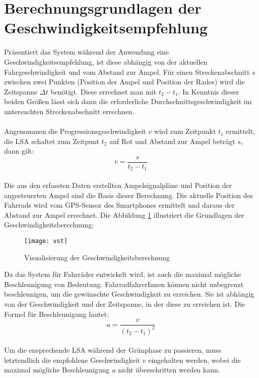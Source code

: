 \section{\label{sec:mathGrundlagen}Berechnungsgrundlagen der Geschwindigkeitsempfehlung}
Präsentiert das System während der Anwendung eine Geschwindigkeitsempfehlung, ist diese abhängig von der aktuellen Fahrgeschwindigkeit und vom Abstand zur Ampel. Für einen Streckenabschnitt $s$ zwischen zwei Punkten (Position der Ampel und Position der Rades) wird die Zeitspanne $\Delta t$ benötigt. Diese errechnet man mit $t_{2} - t_{1}$. In Kenntnis dieser beiden Größen lässt sich dann die erforderliche Durchschnittsgeschwindigkeit im untersuchten Streckenabschnitt errechnen.\\\\ 
Angenommen die Progressionsgeschwindigkeit $v$ wird zum Zeitpunkt $t_{1}$ ermittelt, die \gls {LSA} schaltet zum Zeitpunt $t_{2}$ auf Rot und Abstand zur Ampel beträgt $s$, dann gilt: \\
\[ v = \frac{s}{t_{2} - t_{1}} \] \\
Die aus den erfassten Daten erstellten Ampelsignalpläne und Position der angesteuerten Ampel sind die Basis dieser Berechnung. Die aktuelle Position des Fahrrads wird vom \gls{GPS}-Sensor des \glspl{Smartphone} ermittelt und daraus der Abstand zur Ampel errechnet. Die Abbildung \ref{fig:vst} illustriert die Grundlagen der Geschwindigkeitsberechnung: \\
\begin{figure}[H]  
    \centering  
    \texttt{[image: vst]}  
    \grayRule
    \caption[Berechnung Progressionsgeschwindigkeit]{Visualisierung der Geschwindigkeitsberechnung}
    \label{fig:vst}
\end{figure}
\clearpage
Da das System für Fahrräder entwickelt wird, ist auch die maximal mögliche Beschleunigung von Bedeutung. FahrradfahrerInnen können nicht unbegrenzt beschleunigen, um die gewünschte Geschwindigkeit zu erreichen. Sie ist abhängig von der Geschwindigkeit und der Zeitspanne, in der diese zu erreichen ist. Die Formel für Beschleunigung lautet:
\[ a = \frac{v}{(t_{2} - t_{1})^{2}} \]\\
 Um die ensprechende \gls{LSA} während der Grünphase zu passieren, muss letztendlich die empfohlene Geschwindigkeit $v$ eingehalten werden, wobei die maximal mögliche Beschleunigung $a$ nicht überschritten werden kann.

